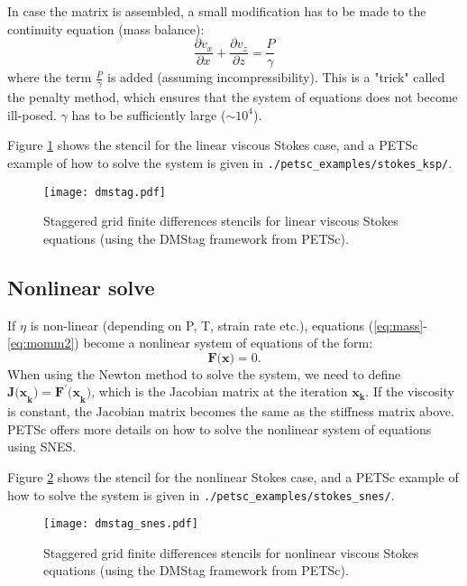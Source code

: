 \documentclass[a4paper,11pt]{article}
\begin{document}
In case the matrix is assembled, a small modification has to be made to the continuity equation (mass balance):
\begin{equation}
\frac{\displaystyle \partial v_x}{\displaystyle \partial x}+\frac{\displaystyle \partial v_z}{\displaystyle \partial z} = \frac{\displaystyle P}{\displaystyle \gamma}
\end{equation}
where the term $\frac{P}{\gamma}$ is added (assuming incompressibility). This is a "trick" called the penalty method, which ensures that the system of equations does not become ill-posed. $\gamma$ has to be sufficiently large ($\sim 10^4$).

Figure \ref{fig:stokes_ksp} shows the stencil for the linear viscous Stokes case, and a PETSc example of how to solve the system is given in \texttt{./petsc\_examples/stokes\_ksp/}.

\begin{figure}
\begin{center}
\noindent \texttt{[image: dmstag.pdf]} 
\caption{Staggered grid finite differences stencils for linear viscous Stokes equations (using the DMStag framework from PETSc).}
\label{fig:stokes_ksp}
  \end{center}
\end{figure}

\subsection{Nonlinear solve}
If $\eta$ is non-linear (depending on P, T, strain rate etc.), equations (\ref{eq:mass}-\ref{eq:momm2}) become a nonlinear system of equations of the form:
\begin{equation}
\textbf{F(x)} = 0.
\end{equation}
When using the Newton method to solve the system, we need to define $\textbf{J(x}_\textbf{k}) = \textbf{F}^\prime\textbf{(x}_\textbf{k})$, which is the Jacobian matrix at the iteration $\textbf{x}_\textbf{k}$. If the viscosity is constant, the Jacobian matrix becomes the same as the stiffness matrix above. PETSc offers more details on how to solve the nonlinear system of equations using SNES.

Figure \ref{fig:stokes_snes} shows the stencil for the nonlinear Stokes case, and a PETSc example of how to solve the system is given in \texttt{./petsc\_examples/stokes\_snes/}.

\begin{figure}
\begin{center}
\noindent \texttt{[image: dmstag\_snes.pdf]} 
\caption{Staggered grid finite differences stencils for nonlinear viscous Stokes equations (using the DMStag framework from PETSc).}
\label{fig:stokes_snes}
  \end{center}
\end{figure}
\end{document}

